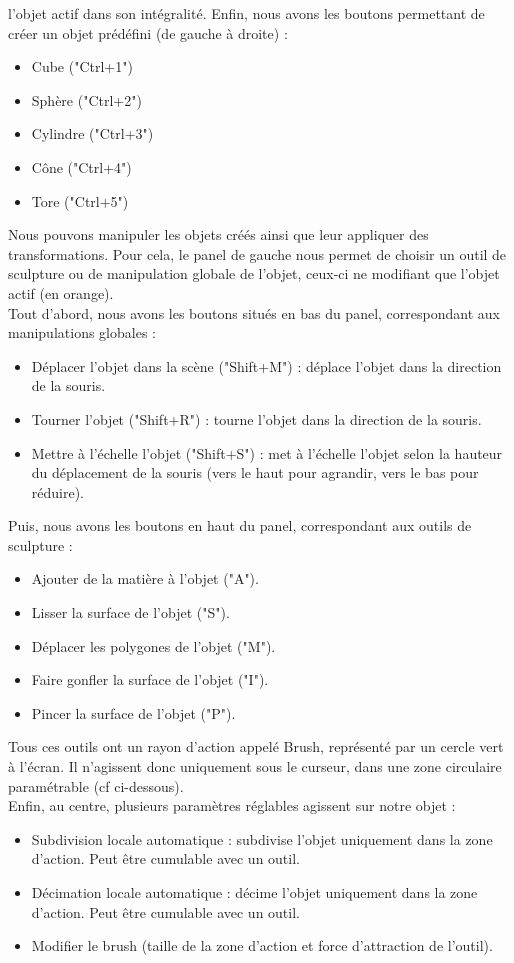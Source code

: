 \documentclass[a4paper]{memoir}
\begin{document}
			l'objet actif dans son intégralité.
			Enfin, nous avons les boutons permettant de créer un objet prédéfini (de gauche à droite) :
			\begin{itemize}
				\item Cube ("Ctrl+1")
				\item Sphère ("Ctrl+2")
				\item Cylindre ("Ctrl+3")
				\item Cône ("Ctrl+4")
				\item Tore ("Ctrl+5")
			\end{itemize}
			Nous pouvons manipuler les objets créés ainsi que leur appliquer des transformations. Pour cela, le panel de gauche nous permet de choisir un 
			outil de sculpture ou de manipulation globale de l'objet, ceux-ci ne modifiant que l'objet actif (en orange).\\
			Tout d'abord, nous avons les boutons situés en bas du panel, correspondant aux manipulations globales :
			\begin{itemize}
				\item Déplacer l'objet dans la scène ("Shift+M") : déplace l'objet dans la direction de la souris.
				\item Tourner l'objet ("Shift+R") : tourne l'objet dans la direction de la souris.
				\item Mettre à l'échelle l'objet ("Shift+S") : met à l'échelle l'objet selon la hauteur du déplacement de la souris (vers le haut pour 
				agrandir, vers le bas pour réduire).
			\end{itemize}
			Puis, nous avons les boutons en haut du panel, correspondant aux outils de sculpture :
			\begin{itemize}
				\item  Ajouter de la matière à l'objet ("A").
				\item  Lisser la surface de l'objet ("S"). 
				\item  Déplacer les polygones de l'objet ("M"). 
				\item  Faire gonfler la surface de l'objet ("I"). 
				\item  Pincer la surface de l'objet ("P").
			\end{itemize}
			Tous ces outils ont un rayon d'action appelé Brush, représenté par un cercle vert à l'écran. Il n'agissent donc uniquement sous le curseur, dans 
			une zone circulaire paramétrable (cf ci-dessous).\\
			Enfin, au centre, plusieurs paramètres réglables agissent sur notre objet : 
			\begin{itemize}
				\item Subdivision locale automatique : subdivise l'objet uniquement dans la zone d'action. Peut être cumulable avec un outil.
				\item Décimation locale automatique : décime l'objet uniquement dans la zone d'action. Peut être cumulable avec un outil.
				\item Modifier le brush (taille de la zone d'action et force d'attraction de l'outil).
			\end{itemize}
\end{document}
